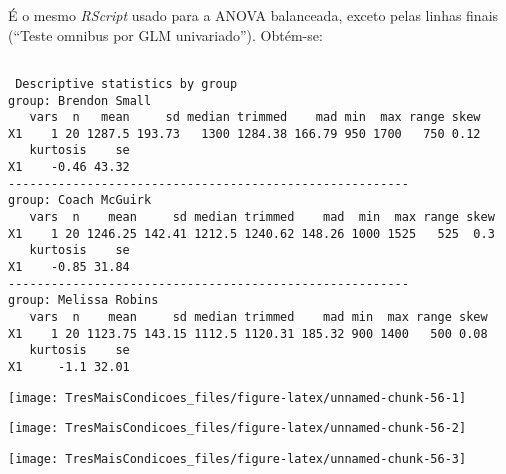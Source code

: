 \documentclass[]{article}
\begin{document}
É o mesmo \emph{RScript} usado para a ANOVA balanceada, exceto pelas
linhas finais (``Teste omnibus por GLM univariado''). Obtém-se:

\begin{verbatim}

 Descriptive statistics by group 
group: Brendon Small
   vars  n   mean     sd median trimmed    mad min  max range skew
X1    1 20 1287.5 193.73   1300 1284.38 166.79 950 1700   750 0.12
   kurtosis    se
X1    -0.46 43.32
-------------------------------------------------------- 
group: Coach McGuirk
   vars  n    mean     sd median trimmed    mad  min  max range skew
X1    1 20 1246.25 142.41 1212.5 1240.62 148.26 1000 1525   525  0.3
   kurtosis    se
X1    -0.85 31.84
-------------------------------------------------------- 
group: Melissa Robins
   vars  n    mean     sd median trimmed    mad min  max range skew
X1    1 20 1123.75 143.15 1112.5 1120.31 185.32 900 1400   500 0.08
   kurtosis    se
X1     -1.1 32.01
\end{verbatim}

\begin{center}\texttt{[image: TresMaisCondicoes\_files/figure-latex/unnamed-chunk-56-1]} \end{center}

\begin{center}\texttt{[image: TresMaisCondicoes\_files/figure-latex/unnamed-chunk-56-2]} \end{center}

\begin{center}\texttt{[image: TresMaisCondicoes\_files/figure-latex/unnamed-chunk-56-3]} \end{center}
\end{document}
